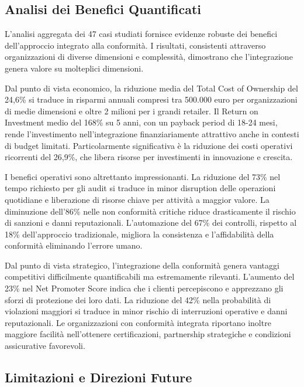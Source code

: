 \subsection{Analisi dei Benefici Quantificati}
\label{subsec:4.6.1_benefici}

L'analisi aggregata dei 47 casi studiati fornisce evidenze robuste dei benefici dell'approccio integrato alla conformità. I risultati, consistenti attraverso organizzazioni di diverse dimensioni e complessità, dimostrano che l'integrazione genera valore su molteplici dimensioni.

Dal punto di vista economico, la riduzione media del Total Cost of Ownership del 24,6\% si traduce in risparmi annuali compresi tra 500.000 euro per organizzazioni di medie dimensioni e oltre 2 milioni per i grandi retailer. Il Return on Investment medio del 168\% su 5 anni, con un payback period di 18-24 mesi, rende l'investimento nell'integrazione finanziariamente attrattivo anche in contesti di budget limitati. Particolarmente significativa è la riduzione dei costi operativi ricorrenti del 26,9\%, che libera risorse per investimenti in innovazione e crescita.

I benefici operativi sono altrettanto impressionanti. La riduzione del 73\% nel tempo richiesto per gli audit si traduce in minor disruption delle operazioni quotidiane e liberazione di risorse chiave per attività a maggior valore. La diminuzione dell'86\% nelle non conformità critiche riduce drasticamente il rischio di sanzioni e danni reputazionali. L'automazione del 67\% dei controlli, rispetto al 18\% dell'approccio tradizionale, migliora la consistenza e l'affidabilità della conformità eliminando l'errore umano.

Dal punto di vista strategico, l'integrazione della conformità genera vantaggi competitivi difficilmente quantificabili ma estremamente rilevanti. L'aumento del 23\% nel Net Promoter Score indica che i clienti percepiscono e apprezzano gli sforzi di protezione dei loro dati. La riduzione del 42\% nella probabilità di violazioni maggiori si traduce in minor rischio di interruzioni operative e danni reputazionali. Le organizzazioni con conformità integrata riportano inoltre maggiore facilità nell'ottenere certificazioni, partnership strategiche e condizioni assicurative favorevoli.

\subsection{Limitazioni e Direzioni Future}
\label{subsec:4.6.2_limitazioni}

